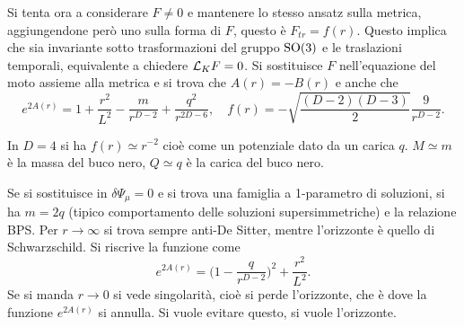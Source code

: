 Si tenta ora a considerare $F \neq 0$ e mantenere lo stesso ansatz sulla metrica, aggiungendone però uno sulla forma di $F$, questo è $F_{tr} = f(r)$. Questo implica che sia invariante sotto trasformazioni del gruppo $\mathrm{SO}(3)$ e le traslazioni temporali, equivalente a chiedere $\mathcal{L}_K F = 0$. Si sostituisce $F$ nell'equazione del moto assieme alla metrica e si trova che $A(r) = -B(r)$ e anche che 
\begin{equation}
    e^{2A(r)} = 1 + \frac{r^2}{L^2} - \frac{m}{r^{D - 2}} + \frac{q^2}{r^{2D - 6}},\quad f(r) = -\sqrt{\frac{(D - 2)(D - 3)}{2}}\frac{9}{r^{D - 2}}.
\end{equation}
\begin{obs}
    In $D = 4$ si ha $f(r) \simeq r^{-2}$ cioè come un potenziale dato da un carica $q$. $M \simeq m$ è la massa del buco nero, $Q \simeq q$ è la carica del buco nero.
\end{obs}
Se si sostituisce in $\delta \Psi_\mu = 0$ e si trova una famiglia a 1-parametro di soluzioni, si ha $m = 2q$ (tipico comportamento delle soluzioni supersimmetriche) e la relazione BPS. Per $r \to \infty$ si trova sempre anti-De Sitter, mentre l'orizzonte è quello di Schwarzschild. Si riscrive la funzione come 
\begin{equation}
    e^{2A(r)} = \bigg(1 - \frac{q}{r^{D - 2}}\bigg)^2 + \frac{r^2}{L^2}. 
\end{equation}
Se si manda $r \to 0$ si vede singolarità, cioè si perde l'orizzonte, che è dove la funzione $e^{2A(r)}$ si annulla. Si vuole evitare questo, si vuole l'orizzonte.

